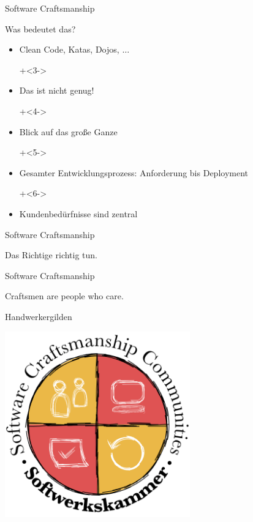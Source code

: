 \begin{frame}{Software Craftsmanship}

\Large{Was bedeutet das?}


\begin{itemize}
\onslide+<2->
	\item Clean Code, Katas, Dojos, $\ldots$
	
\onslide+<3->
	\item Das ist nicht genug!
	
\onslide+<4->
	\item Blick auf das große Ganze
	
\onslide+<5->
	\item Gesamter Entwicklungsprozess: Anforderung bis Deployment
	
\onslide+<6->
	\item Kundenbedürfnisse sind zentral
	
\end{itemize}


\end{frame}


\begin{frame}{Software Craftsmanship}

\begin{center}
\Large
\glqq{}Das Richtige richtig tun.\grqq{}
\end{center}

\end{frame}

\begin{frame}{Software Craftsmanship}

\begin{center}
\Large
\glqq{}Craftsmen are people who care.\grqq{}
\end{center}

\end{frame}

\begin{frame}{Handwerkergilden}

\begin{center}
\includegraphics[width=8cm]{bilder/Softwerkskammer_WappenMitText.png}
\end{center}

\end{frame}

